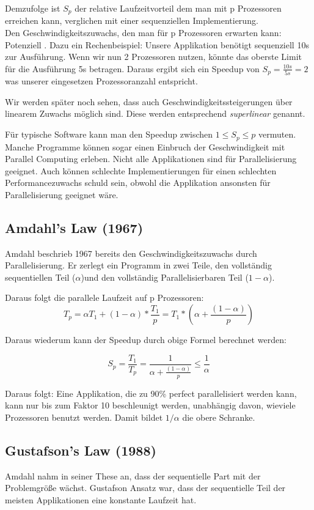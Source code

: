 Demzufolge ist \(S_p\) der relative Laufzeitvorteil dem man mit p Prozessoren erreichen kann, verglichen
mit einer sequenziellen Implementierung.\\

Den Geschwindigkeitszuwachs, den man für p Prozessoren erwarten kann: Potenziell .
Dazu ein Rechenbeispiel: Unsere Applikation benötigt sequenziell 10s zur Ausführung. Wenn wir
nun 2 Prozessoren nutzen, könnte das oberste Limit für die Ausführung 5s betragen. Daraus ergibt
sich ein Speedup von \( S_p = \frac{10s}{5s} = 2 \) was unserer eingesetzen Prozessoranzahl entspricht.

Wir werden später noch sehen, dass auch Geschwindigkeitssteigerungen über linearem Zuwachs möglich sind.
Diese werden entsprechend \textit{superlinear} genannt.

Für typische Software kann man den Speedup zwischen \( 1 \leq S_p \leq p \) vermuten. Manche Programme
können sogar einen Einbruch der Geschwindigkeit mit Parallel Computing erleben. Nicht alle Applikationen
sind für Parallelisierung geeignet. Auch können schlechte Implementierungen für einen schlechten
Performancezuwachs schuld sein, obwohl die Applikation ansonsten für Parallelisierung geeignet wäre.

\subsection{Amdahl's Law (1967)}
Amdahl beschrieb 1967 bereits den Geschwindigkeitszuwachs durch Parallelisierung. Er zerlegt ein Programm
in zwei Teile, den vollständig sequentiellen Teil (\(\alpha\))und den vollständig Parallelisierbaren Teil (\(1-\alpha\)).

Daraus folgt die parallele Laufzeit auf p Prozessoren:
\[ T_p = \alpha T_1 + (1-\alpha)*\frac{T_1}{p} = T_1 * (\alpha + \frac{(1-\alpha)}{p})\]

Daraus wiederum kann der Speedup durch obige Formel berechnet werden:

\[ S_p = \frac{T_1}{T_p} = \frac{1}{\alpha+\frac{(1-\alpha)}{p}} \leq \frac{1}{\alpha} \]

Daraus folgt: Eine Applikation, die zu 90\% perfect parallelisiert werden kann, kann nur bis zum
Faktor 10 beschleunigt werden, unabhängig davon, wieviele Prozessoren benutzt werden. Damit
bildet \(1/\alpha\) die obere Schranke.

\subsection{Gustafson's Law (1988)}
Amdahl nahm in seiner These an, dass der sequentielle Part mit der Problemgröße wächst. Gustafson
Ansatz war, dass der sequentielle Teil der meisten Applikationen eine konstante Laufzeit hat.


